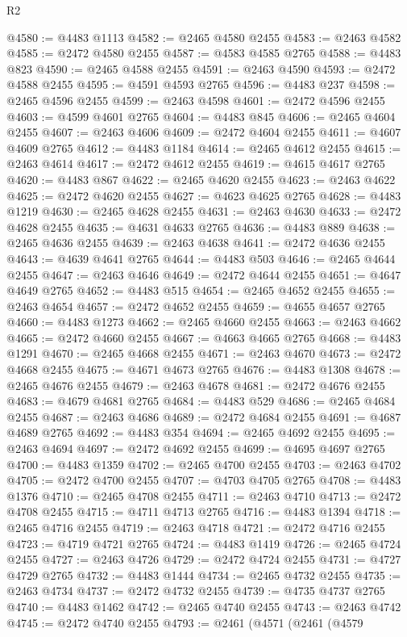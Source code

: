 \begin{lexlean}{R2}
\begin{coremodule}
@4580 := @4483 @1113
@4582 := @2465 @4580 @2455
@4583 := @2463 @4582
@4585 := @2472 @4580 @2455
@4587 := @4583 @4585 @2765
@4588 := @4483 @823
@4590 := @2465 @4588 @2455
@4591 := @2463 @4590
@4593 := @2472 @4588 @2455
@4595 := @4591 @4593 @2765
@4596 := @4483 @237
@4598 := @2465 @4596 @2455
@4599 := @2463 @4598
@4601 := @2472 @4596 @2455
@4603 := @4599 @4601 @2765
@4604 := @4483 @845
@4606 := @2465 @4604 @2455
@4607 := @2463 @4606
@4609 := @2472 @4604 @2455
@4611 := @4607 @4609 @2765
@4612 := @4483 @1184
@4614 := @2465 @4612 @2455
@4615 := @2463 @4614
@4617 := @2472 @4612 @2455
@4619 := @4615 @4617 @2765
@4620 := @4483 @867
@4622 := @2465 @4620 @2455
@4623 := @2463 @4622
@4625 := @2472 @4620 @2455
@4627 := @4623 @4625 @2765
@4628 := @4483 @1219
@4630 := @2465 @4628 @2455
@4631 := @2463 @4630
@4633 := @2472 @4628 @2455
@4635 := @4631 @4633 @2765
@4636 := @4483 @889
@4638 := @2465 @4636 @2455
@4639 := @2463 @4638
@4641 := @2472 @4636 @2455
@4643 := @4639 @4641 @2765
@4644 := @4483 @503
@4646 := @2465 @4644 @2455
@4647 := @2463 @4646
@4649 := @2472 @4644 @2455
@4651 := @4647 @4649 @2765
@4652 := @4483 @515
@4654 := @2465 @4652 @2455
@4655 := @2463 @4654
@4657 := @2472 @4652 @2455
@4659 := @4655 @4657 @2765
@4660 := @4483 @1273
@4662 := @2465 @4660 @2455
@4663 := @2463 @4662
@4665 := @2472 @4660 @2455
@4667 := @4663 @4665 @2765
@4668 := @4483 @1291
@4670 := @2465 @4668 @2455
@4671 := @2463 @4670
@4673 := @2472 @4668 @2455
@4675 := @4671 @4673 @2765
@4676 := @4483 @1308
@4678 := @2465 @4676 @2455
@4679 := @2463 @4678
@4681 := @2472 @4676 @2455
@4683 := @4679 @4681 @2765
@4684 := @4483 @529
@4686 := @2465 @4684 @2455
@4687 := @2463 @4686
@4689 := @2472 @4684 @2455
@4691 := @4687 @4689 @2765
@4692 := @4483 @354
@4694 := @2465 @4692 @2455
@4695 := @2463 @4694
@4697 := @2472 @4692 @2455
@4699 := @4695 @4697 @2765
@4700 := @4483 @1359
@4702 := @2465 @4700 @2455
@4703 := @2463 @4702
@4705 := @2472 @4700 @2455
@4707 := @4703 @4705 @2765
@4708 := @4483 @1376
@4710 := @2465 @4708 @2455
@4711 := @2463 @4710
@4713 := @2472 @4708 @2455
@4715 := @4711 @4713 @2765
@4716 := @4483 @1394
@4718 := @2465 @4716 @2455
@4719 := @2463 @4718
@4721 := @2472 @4716 @2455
@4723 := @4719 @4721 @2765
@4724 := @4483 @1419
@4726 := @2465 @4724 @2455
@4727 := @2463 @4726
@4729 := @2472 @4724 @2455
@4731 := @4727 @4729 @2765
@4732 := @4483 @1444
@4734 := @2465 @4732 @2455
@4735 := @2463 @4734
@4737 := @2472 @4732 @2455
@4739 := @4735 @4737 @2765
@4740 := @4483 @1462
@4742 := @2465 @4740 @2455
@4743 := @2463 @4742
@4745 := @2472 @4740 @2455
@4793 := @2461
    (@4571
      (@2461
        (@4579

\end{coremodule}
\end{lexlean}
